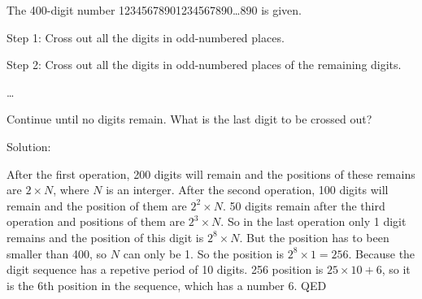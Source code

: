 \documentclass{article}
\begin{document}
%

\begin{description}
\item[2007 國際小學數學自然%
科學奧林匹亞ISMO-數學基%
本題第一題] The 400-digit number
12345678901234567890\ldots 890 is given.

\item Step 1: Cross out all the digits in odd-numbered places.

\item Step 2: Cross out all the digits in odd-numbered places of the
remaining digits.

\item \ldots 

\item Continue until no digits remain. What is the last digit to be crossed
out?
\end{description}

\vspace{2cm}
Solution:
\vspace{1cm}

\bigskip 

After the first operation, 200 digits will remain and the positions of these
remains are $2\times N$, where $N$ is an interger. After the second
operation, 100 digits will remain and the position of them are $2^{2}\times
N $. 50 digits remain after the third operation and positions of them are $%
2^{3}\times N$. So in the last operation only 1 digit remains and the
position of this digit is $2^{8}\times N$. But the position has to been
smaller than 400, so $N$ can only be 1. So the position is $2^{8}\times
1=256 $. Because the digit sequence has a repetive period of 10 digits. 256
position is $25\times 10+6$, so it is the 6th position in the sequence,
which has a number 6. QED
\end{document}
